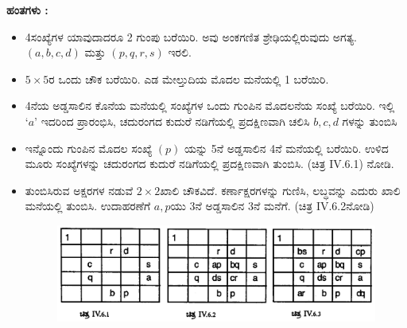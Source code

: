 \textbf{ಹಂತಗಳು :}
\begin{itemize}
	\item 4ಸಂಖ್ಯೆಗಳ ಯಾವುದಾದರೂ 2 ಗುಂಪು ಬರೆಯಿರಿ. ಅವು ಅಂಕಗಣಿತ ಶ್ರೇಢಿಯಲ್ಲಿರುವುದು ಅಗತ್ಯ. $(a, b, c, d)$ ಮತ್ತು $(p, q, r, s)$ ಇರಲಿ.
	\item $5 \times 5$ರ ಒಂದು ಚೌಕ ಬರೆಯಿರಿ. ಎಡ ಮೇಲ್ತುದಿಯ ಮೊದಲ ಮನೆಯಲ್ಲಿ 1 ಬರೆಯಿರಿ.
	\item 4ನೆಯ ಅಡ್ಡಸಾಲಿನ ಕೊನೆಯ ಮನೆಯಲ್ಲಿ ಸಂಖ್ಯೆಗಳ ಒಂದು ಗುಂಪಿನ ಮೊದಲನೆಯ ಸಂಖ್ಯೆ ಬರೆಯಿರಿ. ಇಲ್ಲಿ $‘a’$ ಇದರಿಂದ ಪ್ರಾರಂಭಿಸಿ, ಚದುರಂಗದ ಕುದುರೆ ನಡಿಗೆಯಲ್ಲಿ ಪ್ರದಕ್ಷಿಣವಾಗಿ ಚಲಿಸಿ $b, c, d$ ಗಳನ್ನು ತುಂಬಿಸಿ
	\item ಇನ್ನೊಂದು ಗುಂಪಿನ ಮೊದಲ ಸಂಖ್ಯೆ $(p)$ ಯನ್ನು 5ನೆ ಅಡ್ಡಸಾಲಿನ 4ನೆ ಮನೆಯಲ್ಲಿ ಬರೆಯಿರಿ. ಉಳಿದ ಮೂರು ಸಂಖ್ಯೆಗಳನ್ನು ಚದುರಂಗದ ಕುದುರೆ ನಡಿಗೆಯಲ್ಲಿ ಪ್ರದಕ್ಷಿಣವಾಗಿ ತುಂಬಿಸಿ. (ಚಿತ್ರ IV.6.1) ನೋಡಿ.
	\item ತುಂಬಿಸಿರುವ ಅಕ್ಷರಗಳ ನಡುವೆ $2 \times 2$ಖಾಲಿ ಚೌಕವಿದೆ. ಕರ್ಣಾಕ್ಷರಗಳನ್ನು ಗುಣಿಸಿ, ಲಬ್ಧವನ್ನು ಎದುರು ಖಾಲಿ ಮನೆಯಲ್ಲಿ ತುಂಬಿಸಿ. ಉದಾಹರಣೆಗೆ $a, p$ಯು  3ನೆ ಅಡ್ಡಸಾಲಿನ 3ನೆ ಮನೆಗೆ. (ಚಿತ್ರ IV.6.2ನೋಡಿ)
	\begin{figure}[H]
	\includegraphics[scale=.8]{src/figures/chap7/fig7-28.jpg}
	\end{figure}


\end{itemize}
